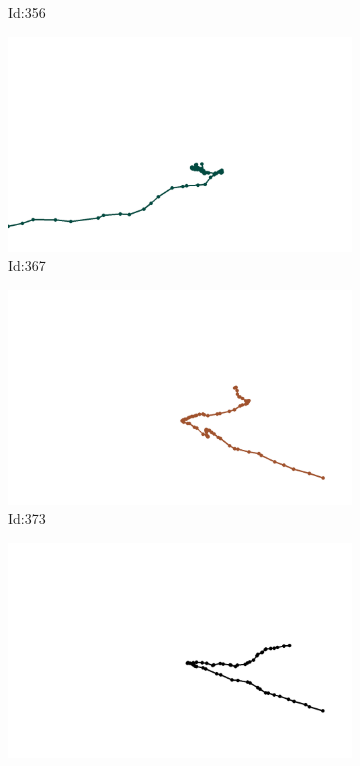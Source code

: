 \documentclass[12pt,twoside]{report}
\begin{document}
\begin{figure}
\begin{subfigure}[b]{0.20\textwidth}
\caption{Id:356}
\end{subfigure}
\begin{subfigure}[b]{0.20\textwidth}
\centering
\includegraphics[width=\textwidth]{../trajectories/367.png}
\caption{Id:367}
\end{subfigure}
\begin{subfigure}[b]{0.20\textwidth}
\centering
\includegraphics[width=\textwidth]{../trajectories/373.png}
\caption{Id:373}
\end{subfigure}
\begin{subfigure}[b]{0.20\textwidth}
\centering
\includegraphics[width=\textwidth]{../trajectories/455.png}

\end{subfigure}
\end{figure}
\end{document}
